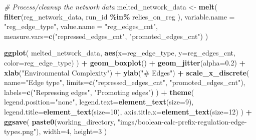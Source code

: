 \documentclass[
]{book}
\newenvironment{Shaded}{\begin{snugshade}}{\end{snugshade}}
\newcommand{\CommentTok}[1]{\textcolor[rgb]{0.56,0.35,0.01}{\textit{#1}}}
\newcommand{\DataTypeTok}[1]{\textcolor[rgb]{0.13,0.29,0.53}{#1}}
\newcommand{\DecValTok}[1]{\textcolor[rgb]{0.00,0.00,0.81}{#1}}
\newcommand{\FloatTok}[1]{\textcolor[rgb]{0.00,0.00,0.81}{#1}}
\newcommand{\KeywordTok}[1]{\textcolor[rgb]{0.13,0.29,0.53}{\textbf{#1}}}
\newcommand{\NormalTok}[1]{#1}
\newcommand{\OperatorTok}[1]{\textcolor[rgb]{0.81,0.36,0.00}{\textbf{#1}}}
\newcommand{\StringTok}[1]{\textcolor[rgb]{0.31,0.60,0.02}{#1}}
\begin{document}
\begin{Shaded}
\begin{Highlighting}[]
\CommentTok{\# Process/cleanup the network data}
\NormalTok{melted\_network\_data \textless{}{-}}\StringTok{ }\KeywordTok{melt}\NormalTok{(}
  \KeywordTok{filter}\NormalTok{(reg\_network\_data,}
\NormalTok{         run\_id }\OperatorTok{\%in\%}\StringTok{ }\NormalTok{relies\_on\_reg}
\NormalTok{        ),}
  \DataTypeTok{variable.name =} \StringTok{"reg\_edge\_type"}\NormalTok{,}
  \DataTypeTok{value.name =} \StringTok{"reg\_edges\_cnt"}\NormalTok{,}
  \DataTypeTok{measure.vars=}\KeywordTok{c}\NormalTok{(}\StringTok{"repressed\_edges\_cnt"}\NormalTok{, }\StringTok{"promoted\_edges\_cnt"}\NormalTok{)}
\NormalTok{)}

\KeywordTok{ggplot}\NormalTok{( melted\_network\_data, }\KeywordTok{aes}\NormalTok{(}\DataTypeTok{x=}\NormalTok{reg\_edge\_type, }\DataTypeTok{y=}\NormalTok{reg\_edges\_cnt, }\DataTypeTok{color=}\NormalTok{reg\_edge\_type) ) }\OperatorTok{+}
\StringTok{  }\KeywordTok{geom\_boxplot}\NormalTok{() }\OperatorTok{+}
\StringTok{  }\KeywordTok{geom\_jitter}\NormalTok{(}\DataTypeTok{alpha=}\FloatTok{0.2}\NormalTok{) }\OperatorTok{+}
\StringTok{  }\KeywordTok{xlab}\NormalTok{(}\StringTok{"Environmental Complexity"}\NormalTok{) }\OperatorTok{+}
\StringTok{  }\KeywordTok{ylab}\NormalTok{(}\StringTok{"\# Edges"}\NormalTok{) }\OperatorTok{+}
\StringTok{  }\KeywordTok{scale\_x\_discrete}\NormalTok{(}
    \DataTypeTok{name=}\StringTok{"Edge type"}\NormalTok{,}
    \DataTypeTok{limits=}\KeywordTok{c}\NormalTok{(}\StringTok{"repressed\_edges\_cnt"}\NormalTok{, }\StringTok{"promoted\_edges\_cnt"}\NormalTok{),}
    \DataTypeTok{labels=}\KeywordTok{c}\NormalTok{(}\StringTok{"Repressing edges"}\NormalTok{, }\StringTok{"Promoting edges"}\NormalTok{)}
\NormalTok{  ) }\OperatorTok{+}
\StringTok{  }\KeywordTok{theme}\NormalTok{(}
    \DataTypeTok{legend.position=}\StringTok{"none"}\NormalTok{,}
    \DataTypeTok{legend.text=}\KeywordTok{element\_text}\NormalTok{(}\DataTypeTok{size=}\DecValTok{9}\NormalTok{),}
    \DataTypeTok{legend.title=}\KeywordTok{element\_text}\NormalTok{(}\DataTypeTok{size=}\DecValTok{10}\NormalTok{),}
    \DataTypeTok{axis.title.x=}\KeywordTok{element\_text}\NormalTok{(}\DataTypeTok{size=}\DecValTok{12}\NormalTok{)}
\NormalTok{  ) }\OperatorTok{+}
\StringTok{  }\KeywordTok{ggsave}\NormalTok{(}
    \KeywordTok{paste0}\NormalTok{(working\_directory, }\StringTok{"imgs/boolean{-}calc{-}prefix{-}regulation{-}edge{-}types.png"}\NormalTok{),}
    \DataTypeTok{width=}\DecValTok{4}\NormalTok{,}
    \DataTypeTok{height=}\DecValTok{3}
\NormalTok{  )}
\end{Highlighting}
\end{Shaded}
\end{document}

